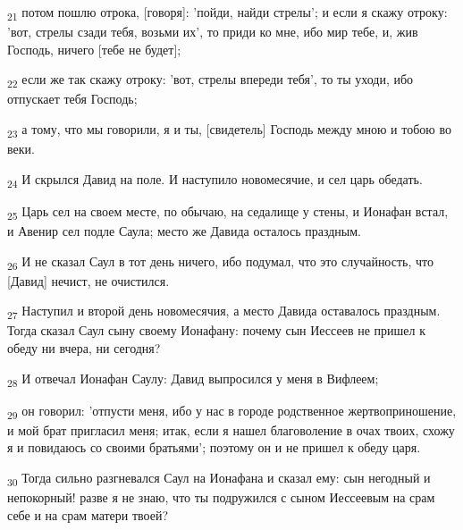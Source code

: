 \begin{tcolorbox}
\textsubscript{21} потом пошлю отрока, [говоря]: 'пойди, найди стрелы'; и если я скажу отроку: 'вот, стрелы сзади тебя, возьми их', то приди ко мне, ибо мир тебе, и, жив Господь, ничего [тебе не будет];
\end{tcolorbox}
\begin{tcolorbox}
\textsubscript{22} если же так скажу отроку: 'вот, стрелы впереди тебя', то ты уходи, ибо отпускает тебя Господь;
\end{tcolorbox}
\begin{tcolorbox}
\textsubscript{23} а тому, что мы говорили, я и ты, [свидетель] Господь между мною и тобою во веки.
\end{tcolorbox}
\begin{tcolorbox}
\textsubscript{24} И скрылся Давид на поле. И наступило новомесячие, и сел царь обедать.
\end{tcolorbox}
\begin{tcolorbox}
\textsubscript{25} Царь сел на своем месте, по обычаю, на седалище у стены, и Ионафан встал, и Авенир сел подле Саула; место же Давида осталось праздным.
\end{tcolorbox}
\begin{tcolorbox}
\textsubscript{26} И не сказал Саул в тот день ничего, ибо подумал, что это случайность, что [Давид] нечист, не очистился.
\end{tcolorbox}
\begin{tcolorbox}
\textsubscript{27} Наступил и второй день новомесячия, а место Давида оставалось праздным. Тогда сказал Саул сыну своему Ионафану: почему сын Иессеев не пришел к обеду ни вчера, ни сегодня?
\end{tcolorbox}
\begin{tcolorbox}
\textsubscript{28} И отвечал Ионафан Саулу: Давид выпросился у меня в Вифлеем;
\end{tcolorbox}
\begin{tcolorbox}
\textsubscript{29} он говорил: 'отпусти меня, ибо у нас в городе родственное жертвоприношение, и мой брат пригласил меня; итак, если я нашел благоволение в очах твоих, схожу я и повидаюсь со своими братьями'; поэтому он и не пришел к обеду царя.
\end{tcolorbox}
\begin{tcolorbox}
\textsubscript{30} Тогда сильно разгневался Саул на Ионафана и сказал ему: сын негодный и непокорный! разве я не знаю, что ты подружился с сыном Иессеевым на срам себе и на срам матери твоей?
\end{tcolorbox}
